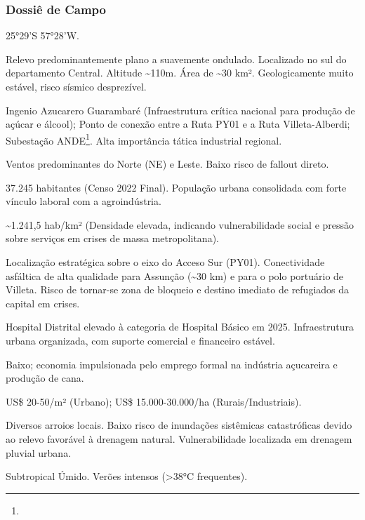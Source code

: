 \subsubsection{Dossiê de Campo}
\begin{description}[style=nextline,leftmargin=0.5cm,font=\bfseries]
\item[Coordenadas]  25°29'S 57°28'W.
\item[Topografia]  Relevo predominantemente plano a suavemente ondulado. Localizado no sul do departamento Central. Altitude \textasciitilde 110m. Área de \textasciitilde 30 km². Geologicamente muito estável, risco sísmico desprezível.
\item[Alvos Estratégicos]  Ingenio Azucarero Guarambaré (Infraestrutura crítica nacional para produção de açúcar e álcool); Ponto de conexão entre a Ruta PY01 e a Ruta Villeta-Alberdi; Subestação ANDE\footnote{\fineANDE}. Alta importância tática industrial regional.
\item[Fallout]  Ventos predominantes do Norte (NE) e Leste. Baixo risco de fallout direto.
\item[População]  37.245 habitantes (Censo 2022 Final). População urbana consolidada com forte vínculo laboral com a agroindústria.
\item[Densidade]  \textasciitilde 1.241,5 hab/\allowbreak km² (Densidade elevada, indicando vulnerabilidade social e pressão sobre serviços em crises de massa metropolitana).
\item[Vias de Acesso]  Localização estratégica sobre o eixo do Acceso Sur (PY01). Conectividade asfáltica de alta qualidade para Assunção (\textasciitilde 30 km) e para o polo portuário de Villeta. Risco de tornar-se zona de bloqueio e destino imediato de refugiados da capital em crises.
\item[Serviços]  Hospital Distrital elevado à categoria de Hospital Básico em 2025. Infraestrutura urbana organizada, com suporte comercial e financeiro estável.
\item[Custo de Vida]  Baixo; economia impulsionada pelo emprego formal na indústria açucareira e produção de cana.
\item[Preço da Terra]  US\$ 20-50/\allowbreak m² (Urbano); US\$ 15.000-30.000/\allowbreak ha (Rurais/\allowbreak Industriais).
\item[Hidrologia]  Diversos arroios locais. Baixo risco de inundações sistêmicas catastróficas devido ao relevo favorável à drenagem natural. Vulnerabilidade localizada em drenagem pluvial urbana.
\item[Clima]  Subtropical Úmido. Verões intensos (>38°C frequentes).

\end{description}
